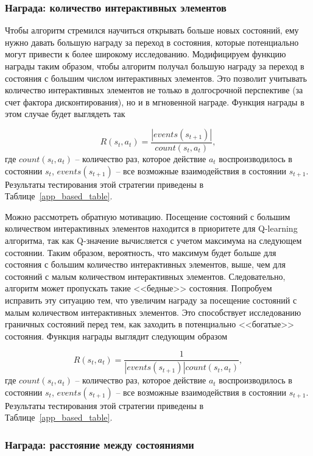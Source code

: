 \subsubsection{Награда: количество интерактивных элементов}\label{possible_events}

Чтобы алгоритм стремился научиться открывать больше новых состояний, ему нужно давать большую награду за переход в состояния, которые потенциально могут привести к более широкому исследованию. Модифицируем функцию награды таким образом, чтобы алгоритм получал большую награду за переход в состояния с большим числом интерактивных элементов. Это позволит учитывать количество интерактивных элементов не только в долгосрочной перспективе (за счет фактора дисконтирования), но и в мгновенной награде. Функция награды в этом случае будет выглядеть так

$$R(s_t, a_t) = \frac{|events(s_{t+1})|}{count(s_t, a_t)},$$
где $count(s_t, a_t)$ -- количество раз, которое действие $a_t$ воспроизводилось в состоянии $s_t$, $events(s_{t+1})$ -- все возможные взаимодействия в состоянии $s_{t+1}$. Результаты тестирования этой стратегии приведены в Таблице~\ref{app_based_table}.

Можно рассмотреть обратную мотивацию. Посещение состояний с большим количеством интерактивных элементов находится в приоритете для Q-learning алгоритма, так как Q-значение вычисляется с учетом максимума на следующем состоянии. Таким образом, вероятность, что максимум будет больше для состояния с большим количество интерактивных элементов, выше, чем для состояний с малым количеством интерактивных элементов. Следовательно, алгоритм может пропускать такие <<бедные>> состояния. Попробуем исправить эту ситуацию тем, что увеличим награду за посещение состояний с малым количеством интерактивных элементов. Это способствует исследованию граничных состояний перед тем, как заходить в потенциально <<богатые>> состояния. Функция награды выглядит следующим образом 

$$R(s_t, a_t) = \frac{1}{|events(s_{t+1})|count(s_t, a_t)},$$
где $count(s_t, a_t)$ -- количество раз, которое действие $a_t$ воспроизводилось в состоянии $s_t$, $events(s_{t+1})$ -- все возможные взаимодействия в состоянии $s_{t+1}$. Результаты тестирования этой стратегии приведены в Таблице~\ref{app_based_table}.

\subsubsection{Награда: расстояние между состояниями}

